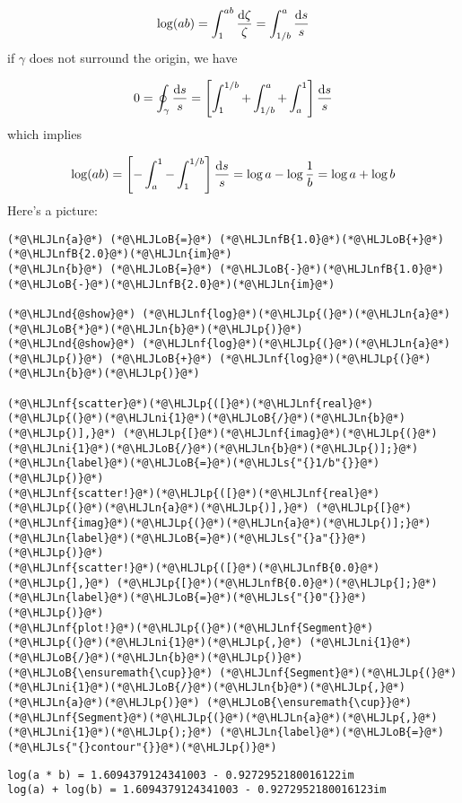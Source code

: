 \documentclass[12pt,landscape]{article}
\newcommand{\HLJLn}[1]{#1}
\newcommand{\HLJLnd}[1]{\textcolor[RGB]{214,102,97}{#1}}
\newcommand{\HLJLnf}[1]{\textcolor[RGB]{66,102,213}{#1}}
\newcommand{\HLJLs}[1]{\textcolor[RGB]{201,61,57}{#1}}
\newcommand{\HLJLnfB}[1]{\textcolor[RGB]{59,151,46}{#1}}
\newcommand{\HLJLni}[1]{\textcolor[RGB]{59,151,46}{#1}}
\newcommand{\HLJLoB}[1]{\textcolor[RGB]{102,102,102}{\textbf{#1}}}
\newcommand{\HLJLp}[1]{#1}
\def\D{ {\rm d} }
\begin{document}
{\[
\log(ab) = \int_1^{ab} {\D \zeta \over \zeta} = \int_{1/b}^a {\D s \over s}
\]
if $\gamma$ does not surround the origin, we have

\[
0 = \oint_\gamma {\D s \over s} = \left[\int_1^{1/b} + \int_{1/b}^a + \int_a^1\right] {\D s \over s}
\]
which implies

\[
\log(ab) = \left[-\int_a^1 -\int_1^{1/b} \right] {\D s \over s} = \log a - \log {1 \over b} = \log a + \log b
\]
Here's a picture:


\begin{lstlisting}
(*@\HLJLn{a}@*) (*@\HLJLoB{=}@*) (*@\HLJLnfB{1.0}@*)(*@\HLJLoB{+}@*)(*@\HLJLnfB{2.0}@*)(*@\HLJLn{im}@*)
(*@\HLJLn{b}@*) (*@\HLJLoB{=}@*) (*@\HLJLoB{-}@*)(*@\HLJLnfB{1.0}@*)(*@\HLJLoB{-}@*)(*@\HLJLnfB{2.0}@*)(*@\HLJLn{im}@*)

(*@\HLJLnd{@show}@*) (*@\HLJLnf{log}@*)(*@\HLJLp{(}@*)(*@\HLJLn{a}@*)(*@\HLJLoB{*}@*)(*@\HLJLn{b}@*)(*@\HLJLp{)}@*)
(*@\HLJLnd{@show}@*) (*@\HLJLnf{log}@*)(*@\HLJLp{(}@*)(*@\HLJLn{a}@*)(*@\HLJLp{)}@*) (*@\HLJLoB{+}@*) (*@\HLJLnf{log}@*)(*@\HLJLp{(}@*)(*@\HLJLn{b}@*)(*@\HLJLp{)}@*)

(*@\HLJLnf{scatter}@*)(*@\HLJLp{([}@*)(*@\HLJLnf{real}@*)(*@\HLJLp{(}@*)(*@\HLJLni{1}@*)(*@\HLJLoB{/}@*)(*@\HLJLn{b}@*)(*@\HLJLp{)],}@*) (*@\HLJLp{[}@*)(*@\HLJLnf{imag}@*)(*@\HLJLp{(}@*)(*@\HLJLni{1}@*)(*@\HLJLoB{/}@*)(*@\HLJLn{b}@*)(*@\HLJLp{)];}@*) (*@\HLJLn{label}@*)(*@\HLJLoB{=}@*)(*@\HLJLs{"{}1/b"{}}@*)(*@\HLJLp{)}@*)
(*@\HLJLnf{scatter!}@*)(*@\HLJLp{([}@*)(*@\HLJLnf{real}@*)(*@\HLJLp{(}@*)(*@\HLJLn{a}@*)(*@\HLJLp{)],}@*) (*@\HLJLp{[}@*)(*@\HLJLnf{imag}@*)(*@\HLJLp{(}@*)(*@\HLJLn{a}@*)(*@\HLJLp{)];}@*) (*@\HLJLn{label}@*)(*@\HLJLoB{=}@*)(*@\HLJLs{"{}a"{}}@*)(*@\HLJLp{)}@*)
(*@\HLJLnf{scatter!}@*)(*@\HLJLp{([}@*)(*@\HLJLnfB{0.0}@*)(*@\HLJLp{],}@*) (*@\HLJLp{[}@*)(*@\HLJLnfB{0.0}@*)(*@\HLJLp{];}@*) (*@\HLJLn{label}@*)(*@\HLJLoB{=}@*)(*@\HLJLs{"{}0"{}}@*)(*@\HLJLp{)}@*)
(*@\HLJLnf{plot!}@*)(*@\HLJLp{(}@*)(*@\HLJLnf{Segment}@*)(*@\HLJLp{(}@*)(*@\HLJLni{1}@*)(*@\HLJLp{,}@*) (*@\HLJLni{1}@*)(*@\HLJLoB{/}@*)(*@\HLJLn{b}@*)(*@\HLJLp{)}@*) (*@\HLJLoB{\ensuremath{\cup}}@*) (*@\HLJLnf{Segment}@*)(*@\HLJLp{(}@*)(*@\HLJLni{1}@*)(*@\HLJLoB{/}@*)(*@\HLJLn{b}@*)(*@\HLJLp{,}@*) (*@\HLJLn{a}@*)(*@\HLJLp{)}@*) (*@\HLJLoB{\ensuremath{\cup}}@*) (*@\HLJLnf{Segment}@*)(*@\HLJLp{(}@*)(*@\HLJLn{a}@*)(*@\HLJLp{,}@*) (*@\HLJLni{1}@*)(*@\HLJLp{);}@*) (*@\HLJLn{label}@*)(*@\HLJLoB{=}@*)(*@\HLJLs{"{}contour"{}}@*)(*@\HLJLp{)}@*)
\end{lstlisting}

\begin{lstlisting}
log(a * b) = 1.6094379124341003 - 0.9272952180016122im
log(a) + log(b) = 1.6094379124341003 - 0.9272952180016123im
\end{lstlisting}

}
\end{document}
